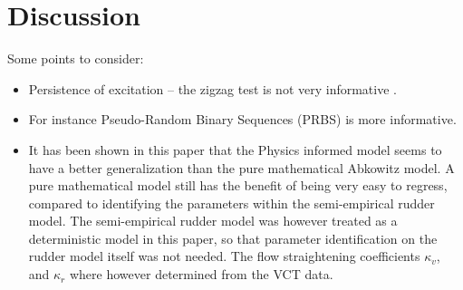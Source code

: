 \section{Discussion}
\label{sec:discussion}

Some points to consider:
\begin{itemize}
    \item Persistence of excitation -- the zigzag test is not very informative \citep{sutulo_algorithm_2014}.
    \item For instance Pseudo-Random Binary Sequences (PRBS) \citep{landau_digital_2006} is more informative.
    \item It has been shown in this paper that the Physics informed model seems to have a better generalization than the pure mathematical Abkowitz model. A pure mathematical model still has the benefit of being very easy to regress, compared to
          identifying the parameters within the semi-empirical rudder model. The semi-empirical rudder model was however treated as a deterministic model in this paper, so that parameter identification on the rudder model itself was not needed. The flow straightening coefficients $\kappa_v$, and $\kappa_r$ where however determined from the VCT data.
\end{itemize}